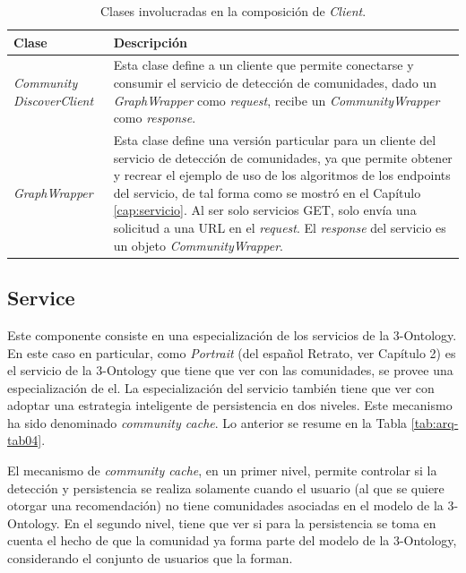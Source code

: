 \begin{table}[H]
  \begin{center}
    \caption{Clases involucradas en la composición de \textit{\textit{Client}}.}
    \label{tab:arq-tab03}
      \begin{tabular}{|L{4cm}|L{10cm}|}
        \hline
        \textbf{Clase} & \textbf{Descripción}\\ \hline
         \textit{Community Discover}\textit{Client} & Esta clase define a un cliente que permite conectarse y consumir el servicio de detección de comunidades, dado un \textit{\textit{Graph}Wrapper} como \textit{request}, recibe un \textit{CommunityWrapper} como \textit{response}.\\ \hline
         \textit{\textit{Graph}Wrapper} & Esta clase define una versión particular para un cliente del servicio de detección de comunidades, ya que permite obtener y recrear el ejemplo de uso de los algoritmos de los endpoints del servicio, de tal forma como se mostró en el Capítulo \ref{cap:servicio}. Al ser solo servicios GET, solo envía una solicitud a una URL en el \textit{request}. El \textit{response} del servicio es un objeto \textit{CommunityWrapper}. \\ \hline
      \end{tabular}
  \end{center}
\end{table}

\subsection{Service}

Este componente consiste en una especialización de los servicios de la 3-Ontology. En este caso en particular, como \textit{Portrait} (del español Retrato, ver Capítulo 2) es el servicio de la 3-Ontology que tiene que ver con las comunidades, se provee una especialización de el. La especialización del servicio también tiene que ver con adoptar una estrategia inteligente de persistencia en dos niveles. Este mecanismo ha sido denominado \textit{community cache}. Lo anterior se resume en la Tabla \ref{tab:arq-tab04}.

El mecanismo de \textit{community cache}, en un primer nivel, permite controlar si la detección y persistencia se realiza solamente cuando el usuario (al que se quiere otorgar una recomendación) no tiene comunidades asociadas en el modelo de la 3-Ontology. En el segundo nivel, tiene que ver si para la persistencia se toma en cuenta el hecho de que la comunidad ya forma parte del modelo de la 3-Ontology, considerando el conjunto de usuarios que la forman.

